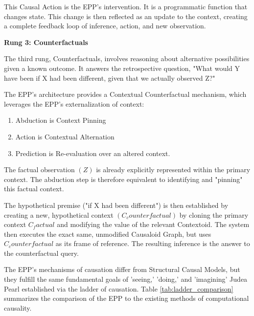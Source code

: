 This Causal Action is the EPP's intervention. It is a programmatic function that changes state. 
This change is then reflected as an update to the context, creating a complete feedback loop of inference, action, and new observation.

\textbf{Rung 3: Counterfactuals}

The third rung, Counterfactuals, involves reasoning about alternative possibilities given a known outcome. It answers the retrospective question, "What would Y have been if X had been different, given that we actually observed Z?"

The EPP's architecture provides a Contextual Counterfactual mechanism, which leverages the EPP's externalization of context:

\begin{enumerate}
	\item Abduction is Context Pinning
	\item Action is Contextual Alternation
	\item Prediction is Re-evaluation over an altered context. 
\end{enumerate}

The factual observation $(Z)$ is already explicitly represented within the primary context. 
The abduction step is therefore equivalent to identifying and "pinning" this factual context.

The hypothetical premise ("if X had been different") is then established by creating a new, hypothetical context $(C_counterfactual)$ by cloning the primary context $C_factual$ and modifying the value of the relevant Contextoid. The system then executes the exact same, unmodified Causaloid Graph, but uses $C_counterfactual$ as its frame of reference. The resulting inference is the answer to the counterfactual query. 


The EPP's mechanisms of causation differ from Structural Causal Models, 
but they fulfill the same fundamental goals of 'seeing,' 'doing,' and 'imagining' Judea Pearl established
via the ladder of causation. Table \ref{tab:ladder_comparison} summarizes the comparison of the EPP to the existing methods of computational causality.
 

